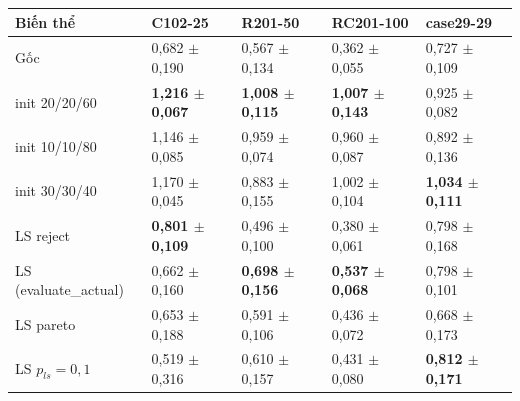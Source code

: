 \begin{tabular}{@{}lllll@{}}
\toprule
Biến thể & C102-25 & R201-50 & RC201-100 & case29-29 \\
\midrule
Gốc & 0{,}682 $\pm$ 0{,}190 & 0{,}567 $\pm$ 0{,}134 & 0{,}362 $\pm$ 0{,}055 & 0{,}727 $\pm$ 0{,}109 \\
\midrule
init 20/20/60 & \textbf{1{,}216 $\pm$ 0{,}067} & \textbf{1{,}008 $\pm$ 0{,}115} & \textbf{1{,}007 $\pm$ 0{,}143} & 0{,}925 $\pm$ 0{,}082 \\
init 10/10/80 & 1{,}146 $\pm$ 0{,}085 & 0{,}959 $\pm$ 0{,}074 & 0{,}960 $\pm$ 0{,}087 & 0{,}892 $\pm$ 0{,}136 \\
init 30/30/40 & 1{,}170 $\pm$ 0{,}045 & 0{,}883 $\pm$ 0{,}155 & 1{,}002 $\pm$ 0{,}104 & \textbf{1{,}034 $\pm$ 0{,}111} \\
\midrule
LS reject & \textbf{0{,}801 $\pm$ 0{,}109} & 0{,}496 $\pm$ 0{,}100 & 0{,}380 $\pm$ 0{,}061 & 0{,}798 $\pm$ 0{,}168 \\
LS (evaluate\_actual) & 0{,}662 $\pm$ 0{,}160 & \textbf{0{,}698 $\pm$ 0{,}156} & \textbf{0{,}537 $\pm$ 0{,}068} & 0{,}798 $\pm$ 0{,}101 \\
LS pareto & 0{,}653 $\pm$ 0{,}188 & 0{,}591 $\pm$ 0{,}106 & 0{,}436 $\pm$ 0{,}072 & 0{,}668 $\pm$ 0{,}173 \\
LS $p_{ls}=0{,}1$ & 0{,}519 $\pm$ 0{,}316 & 0{,}610 $\pm$ 0{,}157 & 0{,}431 $\pm$ 0{,}080 & \textbf{0{,}812 $\pm$ 0{,}171} \\
\bottomrule
\end{tabular}
